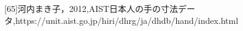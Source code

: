 \documentclass[a4paper,10pt,oneside,openany]{jsbook}
\begin{document}
%
\frontmatter

\tableofcontents

\mainmatter






%




%



[65]河内まき子，2012,AIST日本人の手の寸法データ,https://unit.aist.go.jp/hiri/dhrg/ja/dhdb/hand/index.html

\newpage
\printindex
\end{document}
